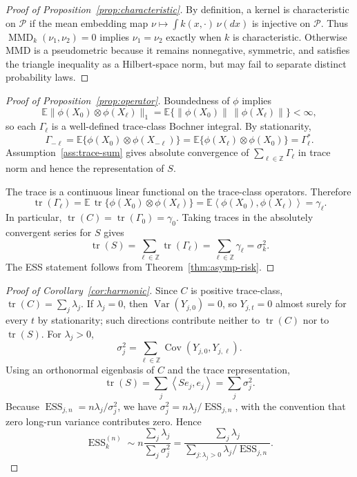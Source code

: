 \documentclass[11pt]{article}
\newcommand{\E}{\mathbb{E}}
\newcommand{\1}{\mathbf{1}}
\newcommand{\inner}[2]{\left\langle #1, #2 \right\rangle}
\newcommand{\MMD}{\operatorname{MMD}}
\newcommand{\ESS}{\operatorname{ESS}}
\newcommand{\tr}{\operatorname{tr}}
\newcommand{\Cov}{\operatorname{Cov}}
\newcommand{\Var}{\operatorname{Var}}
\begin{document}
\begin{proof}[Proof of Proposition~\ref{prop:characteristic}]
By definition, a kernel is characteristic on $\mathcal P$ if the mean embedding map $\nu\mapsto\int k(x,\cdot)\,\nu(dx)$ is injective on $\mathcal P$. Thus $\MMD_k(\nu_1,\nu_2)=0$ implies $\nu_1=\nu_2$ exactly when $k$ is characteristic. Otherwise MMD is a pseudometric because it remains nonnegative, symmetric, and satisfies the triangle inequality as a Hilbert-space norm, but may fail to separate distinct probability laws.
\end{proof}

\begin{proof}[Proof of Proposition~\ref{prop:operator}]
Boundedness of $\phi$ implies
\[
\E\|\phi(X_0)\otimes\phi(X_\ell)\|_1
=\E\{\|\phi(X_0)\|\,\|\phi(X_\ell)\|\}<\infty,
\]
so each $\Gamma_\ell$ is a well-defined trace-class Bochner integral. By stationarity,
\[
\Gamma_{-\ell}
=\E\{\phi(X_0)\otimes\phi(X_{-\ell})\}
=\E\{\phi(X_\ell)\otimes\phi(X_0)\}
=\Gamma_\ell^*.
\]
Assumption~\ref{ass:trace-sum} gives absolute convergence of $\sum_{\ell\in\mathbb Z}\Gamma_\ell$ in trace norm and hence the representation of $S$.

The trace is a continuous linear functional on the trace-class operators. Therefore
\[
\tr(\Gamma_\ell)
=\E\,\tr\{\phi(X_0)\otimes\phi(X_\ell)\}
=\E\inner{\phi(X_0)}{\phi(X_\ell)}
=\gamma_\ell.
\]
In particular, $\tr(C)=\tr(\Gamma_0)=\gamma_0$. Taking traces in the absolutely convergent series for $S$ gives
\[
\tr(S)=\sum_{\ell\in\mathbb Z}\tr(\Gamma_\ell)=\sum_{\ell\in\mathbb Z}\gamma_\ell=\sigma_k^2.
\]
The ESS statement follows from Theorem~\ref{thm:asymp-risk}.
\end{proof}

\begin{proof}[Proof of Corollary~\ref{cor:harmonic}]
Since $C$ is positive trace-class, $\tr(C)=\sum_j\lambda_j$. If $\lambda_j=0$, then $\Var(Y_{j,0})=0$, so $Y_{j,t}=0$ almost surely for every $t$ by stationarity; such directions contribute neither to $\tr(C)$ nor to $\tr(S)$. For $\lambda_j>0$,
\[
\sigma_j^2=\sum_{\ell\in\mathbb Z}\Cov(Y_{j,0},Y_{j,\ell}).
\]
Using an orthonormal eigenbasis of $C$ and the trace representation,
\[
\tr(S)=\sum_j\inner{S e_j}{e_j}
=\sum_j\sigma_j^2.
\]
Because $\ESS_{j,n}=n\lambda_j/\sigma_j^2$, we have $\sigma_j^2=n\lambda_j/\ESS_{j,n}$, with the convention that zero long-run variance contributes zero. Hence
\[
\ESS_k^{(n)}\sim n\frac{\sum_j\lambda_j}{\sum_j\sigma_j^2}
=\frac{\sum_j\lambda_j}{\sum_{j:\lambda_j>0}\lambda_j/\ESS_{j,n}}.
\]
\end{proof}
\end{document}
